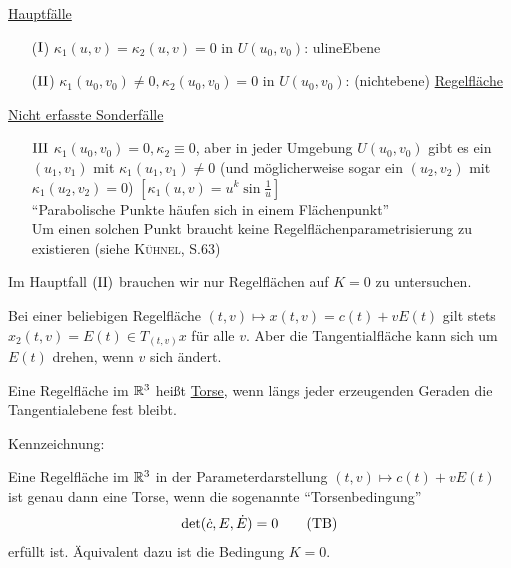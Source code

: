 \uline{Hauptfälle}
\begin{enumerate}
 \item[{\color{green}(\(\Rom1\))}] \(\kappa_1(u,v) = \kappa_2(u,v) = 0\) in \(U(u_0, v_0)\): uline{Ebene}
 \item[{\color{green}(\(\Rom2\))}] \(\kappa_1(u_0, v_0) \ne 0, \kappa_2(u_0, v_0) = 0\) in \(U(u_0, v_0)\): (nichtebene) \uline{Regelfläche}
\end{enumerate}

\uline{Nicht erfasste Sonderfälle}
\begin{enumerate}
 \item[{\color{magenta}\(\Rom3\)}] \(\kappa_1 (u_0, v_0) = 0, \kappa_2 \equiv 0\), aber in jeder Umgebung \(U(u_0, v_0)\) gibt es ein \((u_1, v_1)\) mit \(\kappa_1(u_1, v_1) \ne 0\) (und möglicherweise sogar ein \((u_2, v_2)\) mit \(\kappa_1(u_2, v_2) = 0\)) \(\left[\kappa_1 (u, v) = u^k \sin \frac{1}{u}\right]\) \\
``Parabolische Punkte häufen sich in einem Flächenpunkt'' \\
 Um einen solchen Punkt braucht keine Regelflächenparametrisierung zu existieren (siehe \textsc{Kühnel}, S.63)
\end{enumerate}
Im Hauptfall \((\Rom2)\) brauchen wir nur Regelflächen auf \(K = 0\) zu untersuchen. \par
Bei einer beliebigen Regelfläche \((t,v) \mapsto x(t,v) = c(t) + v E(t)\) gilt stets \(x_2 (t,v) = E(t) \in T_{(t,v)}x\) für alle \(v\). Aber die Tangentialfläche kann sich um \(E(t)\) drehen, wenn \(v\) sich ändert.

\begin{definition}
 Eine Regelfläche im \(\mathbb{R}^3\) heißt \uline{Torse}, wenn längs jeder erzeugenden Geraden die Tangentialebene fest bleibt.
\end{definition}

Kennzeichnung:

\begin{satz}\label{satz263}
 Eine Regelfläche im \(\mathbb{R}^3\) in der Parameterdarstellung \((t,v) \mapsto c(t) + v E(t)\) ist genau dann eine Torse, wenn die sogenannte ``Torsenbedingung''
 \Links
 \begin{align*}
  \det(\dot c, E, \dot E) = 0 \tag{\text{TB}}
 \end{align*}
 erfüllt ist. Äquivalent dazu ist die Bedingung \(K = 0\).
\end{satz}

